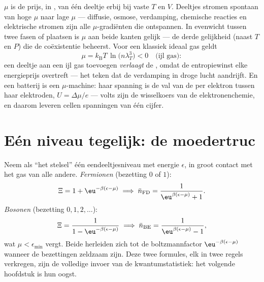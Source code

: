 \begin{definition}\label{def:b3:grand-canonical:mu}
$\mu$ is de prijs, in , van één deeltje erbij bij vaste $T$
en $V$. Deeltjes stromen spontaan van hoge $\mu$ naar lage $\mu$ ---
diffusie, osmose, verdamping, chemische reacties en elektrische stromen
zijn alle $\mu$-gradiënten die ontspannen. In evenwicht tussen twee fasen
of plaatsen is $\mu$ aan beide kanten gelijk --- de derde gelijkheid
(naast $T$ en $P$) die de coëxistentie beheerst. Voor een klassiek ideaal
gas geldt
\[
\mu = k_{\text{B}}T\,\ln\!\big(n\lambda_T^3\big) < 0
\quad\text{(ijl gas)} :
\]
een deeltje aan een ijl gas toevoegen \emph{verlaagt} de ,
omdat de entropiewinst elke energieprijs overtreft --- het teken dat de
verdamping in droge lucht aandrijft. En een batterij is een
$\mu$-machine: haar spanning is de val van de  per
elektron tussen haar elektroden, $U = \Delta\mu/e$ --- volts zijn de
wisselkoers van de elektronenchemie, en daarom leveren cellen spanningen
van één cijfer.
\end{definition}

\section{Eén niveau tegelijk: de moedertruc}

\begin{theorem}\label{thm:b3:grand-canonical:occupation}
Neem als ``het stelsel'' één eendeeltjesniveau met energie $\epsilon$, in
groot contact met het gas van alle andere. \emph{Fermionen} (bezetting $0$
of $1$):
\[
\Xi = 1 + \eu^{-\beta(\epsilon - \mu)}
\;\Longrightarrow\;
\bar n_{\text{FD}} = \frac{1}{\eu^{\beta(\epsilon - \mu)} + 1} .
\]
\emph{Bosonen} (bezetting $0, 1, 2, \dots$):
\[
\Xi = \frac{1}{1 - \eu^{-\beta(\epsilon - \mu)}}
\;\Longrightarrow\;
\bar n_{\text{BE}} = \frac{1}{\eu^{\beta(\epsilon - \mu)} - 1} ,
\]
wat $\mu < \epsilon_{\min}$ vergt. Beide herleiden zich tot de
boltzmannfactor $\eu^{-\beta(\epsilon - \mu)}$ wanneer de bezettingen
zeldzaam zijn. Deze twee formules, elk in twee regels verkregen, zijn de
volledige invoer van de kwantumstatistiek: het volgende hoofdstuk is hun
oogst.
\end{theorem}

